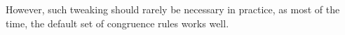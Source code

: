 \begin{isabellebody}
\begin{isamarkuptext}
  However, such tweaking should rarely be necessary in
  practice, as most of the time, the default set of congruence rules
  works well.%
\end{isamarkuptext}%
\isamarkuptrue%
%
\isadelimtheory
%
\endisadelimtheory
%
\isatagtheory
{}\isamarkupfalse%
%
\endisatagtheory
{\isafoldtheory}%
%
\isadelimtheory
%
\endisadelimtheory
\isanewline
\end{isabellebody}%
